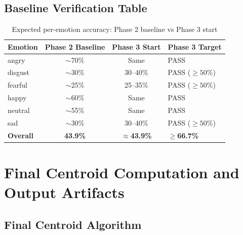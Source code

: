 \documentclass[12pt,a4paper]{article}
\theoremstyle{definition}
\theoremstyle{remark}
\begin{document}
\subsection{Baseline Verification Table}

\begin{table}[H]
\centering
\caption{Expected per-emotion accuracy: Phase 2 baseline vs Phase 3 start}
\begin{tabular}{lccl}
\toprule
Emotion & Phase 2 Baseline & Phase 3 Start & Phase 3 Target \\
\midrule
angry   & $\sim$70\% & Same & PASS \\
disgust & $\sim$30\% & 30--40\% & PASS ($\geq 50\%$) \\
fearful & $\sim$25\% & 25--35\% & PASS ($\geq 50\%$) \\
happy   & $\sim$60\% & Same & PASS \\
neutral & $\sim$55\% & Same & PASS \\
sad     & $\sim$30\% & 30--40\% & PASS ($\geq 50\%$) \\
\midrule
\textbf{Overall} & \textbf{43.9\%} & \textbf{$\approx$43.9\%} & $\geq$\textbf{66.7\%} \\
\bottomrule
\end{tabular}
\end{table}

\section{Final Centroid Computation and Output Artifacts}

\subsection{Final Centroid Algorithm}
\end{document}
